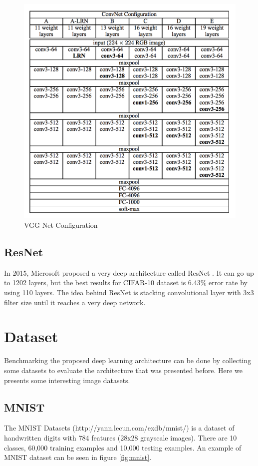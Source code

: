 \begin{figure}[h]
	\includegraphics[scale=0.5]{figures/vggnet}
	\centering
	\caption{VGG Net Configuration \cite{simonyan2014very}}
	\label{fig:vgg}
\end{figure}


\subsection{ResNet}
In 2015, Microsoft proposed a very deep architecture called ResNet \cite{he2016deep}. It can go up to 1202 layers, but the best results for CIFAR-10 dataset is 6.43\% error rate by using 110 layers. The idea behind ResNet is stacking convolutional layer with 3x3 filter size until it reaches a very deep network.  


\section{Dataset}
Benchmarking the proposed deep learning architecture can be done by collecting some datasets to evaluate the architecture that was presented before. Here we presents some interesting image datasets.
\subsection{MNIST}
The MNIST Datasets (http://yann.lecun.com/exdb/mnist/) is a dataset of handwritten digits with 784 features (28x28 grayscale images). There are 10 classes, 60,000 training examples and 10,000 testing examples. An example of MNIST dataset can be seen in figure \ref{fig:mnist}.

